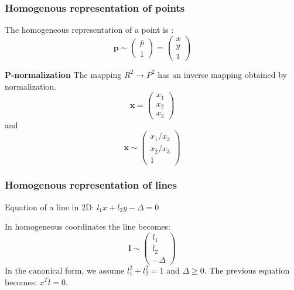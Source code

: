 \subsubsection{Homogenous representation of points}
The homogeneous representation of a point is :
\begin{equation}
    \textbf{p} \sim \left(\begin{array}{c}
        \bar{p}\\1
    \end{array}\right)
    =
    \left(\begin{array}{c}
        x\\y\\1
    \end{array}\right)
\end{equation}

\textbf{P-normalization}
The mapping $R^2 \rightarrow P^2$ has an inverse mapping obtained by normalization.
\begin{equation}
    \textbf{x} = \left(\begin{array}{c}
        x_1 \\ x_2 \\ x_3
    \end{array}\right)
\end{equation}
and
\begin{equation}
    \textbf{x} \sim \left(\begin{array}{c}
        x_1 / x_3 \\ x_2 / x_3 \\ 1
    \end{array}\right)
\end{equation}


\subsubsection{Homogenous representation of lines}
Equation of a line in 2D: $l_1x + l_2y - \Delta = 0$

In homogeneous coordinates the line becomes:
\begin{equation}
    \textbf{l} \sim \left(\begin{array}{c}
        l_1 \\ l_2 \\ -\Delta
    \end{array}\right)
\end{equation}
In the canonical form, we assume $l_1^2 + l_2^2 = 1$ and $\Delta \ge 0$.
The previous equation becomes: $x^Tl=0$.


